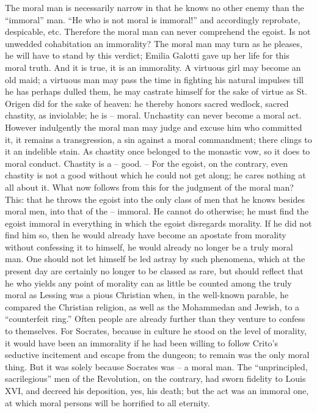 \documentclass[12pt,a4paper]{book}
\begin{document}
The moral man is necessarily narrow in that he knows no other enemy than the 
``immoral'' man. ``He who is not moral is immoral!'' and accordingly 
reprobate, despicable, etc. Therefore the moral man can never comprehend the 
egoist. Is not unwedded cohabitation an immorality? The moral man may turn as 
he pleases, he will have to stand by this verdict; Emilia Galotti gave up her 
life for this moral truth. And it is true, it is an immorality. A virtuous 
girl may become an old maid; a virtuous man may pass the time in fighting his 
natural impulses till he has perhaps dulled them, he may castrate himself for 
the sake of virtue as St. Origen did for the sake of heaven: he thereby honors 
sacred wedlock, sacred chastity, as inviolable; he is -- moral. Unchastity can 
never become a moral act. However indulgently the moral man may judge and 
excuse him who committed it, it remains a transgression, a sin against a moral 
commandment; there clings to it an indelible stain. As chastity once belonged 
to the monastic vow, so it does to moral conduct. Chastity is a -- good. -- 
For the egoist, on the contrary, even chastity is not a good without which he 
could not get along; he cares nothing at all about it. What now follows from 
this for the judgment of the moral man? This: that he throws the egoist into 
the only class of men that he knows besides moral men, into that of the -- 
immoral. He cannot do otherwise; he must find the egoist immoral in everything 
in which the egoist disregards morality. If he did not find him so, then he 
would already have become an apostate from morality without confessing it to 
himself, he would already no longer be a truly moral man. One should not let 
himself be led astray by such phenomena, which at the present day are 
certainly no longer to be classed as rare, but should reflect that he who 
yields any point of morality can as little be counted among the truly moral as 
Lessing was a pious Christian when, in the well-known parable, he compared the 
Christian religion, as well as the Mohammedan and Jewish, to a ``counterfeit 
ring.'' Often people are already further than they venture to confess to 
themselves. For Socrates, because in culture he stood on the level of 
morality, it would have been an immorality if he had been willing to follow 
Crito's seductive incitement and escape from the dungeon; to remain was the 
only moral thing. But it was solely because Socrates was -- a moral man. The 
``unprincipled, sacrilegious'' men of the Revolution, on the contrary, had 
sworn fidelity to Louis XVI, and decreed his deposition, yes, his death; but 
the act was an immoral one, at which moral persons will be horrified to all 
eternity.
\end{document}
